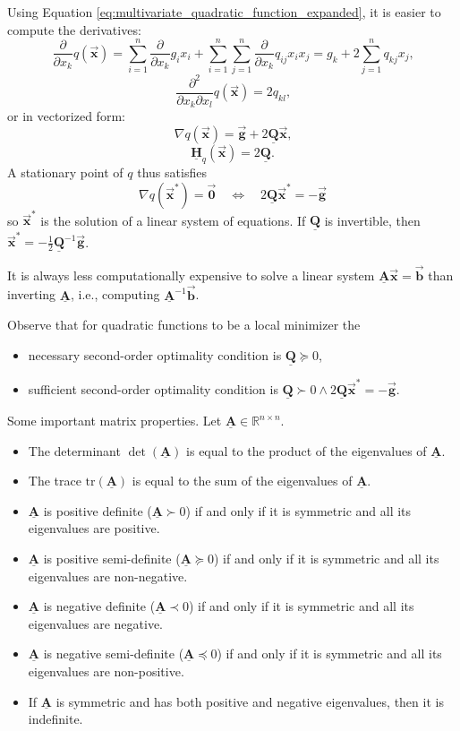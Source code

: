 \documentclass[9pt, headings=standardclasses, parskip=half]{scrartcl}
\newcommand{\matr}[1]{\underline{\boldsymbol{#1}}}
\newcommand{\vect}[1]{\vec{\boldsymbol{#1}}}
\begin{document}
Using Equation \eqref{eq:multivariate_quadratic_function_expanded}, it is easier to compute the derivatives:
\[
\frac{\partial}{\partial x_{k}}q(\vect{x}) = \sum_{i=1}^{n}\frac{\partial}{\partial x_{k}}g_{i}x_{i} + \sum_{i=1}^{n}\sum_{j=1}^{n}\frac{\partial}{\partial x_{k}}q_{ij}x_{i}x_{j} = g_{k} + 2\sum_{j=1}^{n}q_{kj}x_{j} \text{,}
\]
\[
\frac{\partial^{2}}{\partial x_{k}\partial x_{l}}q(\vect{x}) = 2q_{kl} \text{,}
\]
or in vectorized form:
\[
\nabla q(\vect{x}) = \vect{g} + 2\matr{Q}\vect{x} \text{,}
\]
\[
\matr{H}_{q}(\vect{x}) = 2\matr{Q} \text{.}
\]
A stationary point of \(q\) thus satisfies
\[
\nabla q(\vect{x}^{*}) = \vect{0} \quad \Longleftrightarrow  \quad 2\matr{Q}\vect{x}^{*} = -\vect{g}
\]
so \(\vect{x}^{*}\) is the solution of a linear system of equations. If \(\matr{Q}\) is invertible, then 
\(\vect{x}^{*} = -\frac{1}{2}\matr{Q}^{-1}\vect{g}\).

\begin{remark}
It is always less computationally expensive to solve a linear system \(\matr{A}\vect{x} = \vect{b}\) than inverting \(\matr{A}\), i.e., computing \(\matr{A}^{-1}\vect{b}\).
\end{remark}

Observe that for quadratic functions to be a local minimizer the
\begin{itemize}
\item necessary second-order optimality condition is \(\matr{Q} \succeq 0\),
\item sufficient second-order optimality condition is \(\matr{Q} \succ 0 \wedge 2\matr{Q}\vect{x}^{*} = -\vect{g}\).
\end{itemize}

\begin{caution}
Some important matrix properties. Let \(\matr{A} \in \mathbb{R}^{n \times n}\).
\begin{itemize}
\item The determinant \(\det(\matr{A})\) is equal to the product of the eigenvalues of \(\matr{A}\).
\item The trace \(\mathrm{tr}(\matr{A})\) is equal to the sum of the eigenvalues of \(\matr{A}\).
\item \(\matr{A}\) is positive definite (\(\matr{A} \succ 0\)) if and only if it is symmetric and all its eigenvalues are positive.
\item \(\matr{A}\) is positive semi-definite (\(\matr{A} \succeq 0\)) if and only if it is symmetric and all its eigenvalues are non-negative.
\item \(\matr{A}\) is negative definite (\(\matr{A} \prec 0\)) if and only if it is symmetric and all its eigenvalues are negative.
\item \(\matr{A}\) is negative semi-definite (\(\matr{A} \preceq 0\)) if and only if it is symmetric and all its eigenvalues are non-positive.
\item If \(\matr{A}\) is symmetric and has both positive and negative eigenvalues, then it is indefinite.
\end{itemize}
\end{caution}
\end{document}
